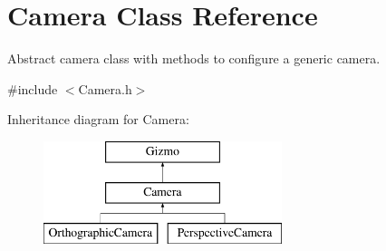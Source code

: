 \hypertarget{class_camera}{\section{Camera Class Reference}
\label{class_camera}
}


Abstract camera class with methods to configure a generic camera.  




{\ttfamily \#include $<$Camera.\+h$>$}

Inheritance diagram for Camera\+:\begin{figure}[H]
\begin{center}
\leavevmode
\includegraphics[height=3.000000cm]{class_camera}
\end{center}
\end{figure}
